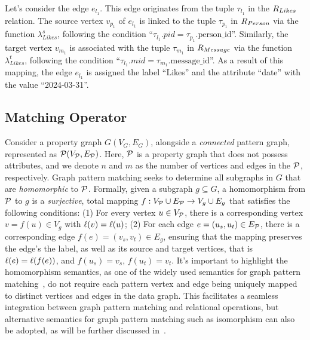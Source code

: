 \begin{example}
    Let's consider the edge $e_{l_1}$. This edge originates from the tuple $\tau_{l_1}$ in the ${R_{Likes}}$ relation. The source vertex $v_{p_1}$ of $e_{l_1}$ is linked to the tuple $\tau_{p_1}$ in ${R_{Person}}$ via the function $\lambda_{Likes}^s$, following the condition ``$\tau_{l_1}.pid = \tau_{p_1}.\text{person\_id}$''. Similarly, the target vertex $v_{m_1}$ is associated with the tuple $\tau_{m_1}$ in ${R_{Message}}$ via the function $\lambda_{Likes}^t$, following the condition ``$\tau_{l_1}.mid = \tau_{m_1}.\text{message\_id}$''. As a result of this mapping, the edge $e_{l_1}$ is assigned the label ``Likes'' and the attribute ``date'' with the value ``2024-03-31''.
\end{example}



\subsection{Matching Operator}
\label{sec:matching-operator}
Consider a property graph \(G(V_G, E_G)\), alongside a \emph{connected} pattern graph, represented as \(\mathcal{P}(V_{\mathcal{P}}, E_{\mathcal{P}})\). Here, \(\mathcal{P}\) is a property graph that does not possess attributes, and
we denote $n$ and $m$ as the number of vertices and edges in the $\mathcal{P}$, respectively.
Graph pattern matching seeks to determine all subgraphs in \(G\) that are \emph{homomorphic} to \(\mathcal{P}\).
Formally, given a subgraph $g \subseteq G$, a homomorphism from \(\mathcal{P}\) to \(g\) is a \emph{surjective}, total mapping \(f: V_{\mathcal{P}} \cup E_{\mathcal{P}} \to V_{g} \cup E_{g}\) that satisfies the following conditions: (1) For every vertex \(u \in V_{\mathcal{P}}\), there is a corresponding vertex \(v = f(u) \in V_{g}\) with \(\mathcal{\ell}(v) = \mathcal{\ell}(u)\); (2) For each edge \(e = (u_s, u_t) \in E_{\mathcal{P}}\), there is a corresponding edge \(f(e) = (v_s, v_t) \in E_{g}\), ensuring that the mapping preserves the edge's the label, as well as its source and target vertices, that is \(\mathcal{\ell}(e) = \mathcal{\ell}(f(e))\), and \(f(u_s) = v_s\), \(f(u_t) = v_t\). It's important to highlight the homomorphism semantics, as one of the widely used semantics for graph pattern matching~\cite{angles2017foundations}, do not require each pattern vertex and edge being uniquely mapped to distinct vertices and edges in the data graph. This facilitates a seamless integration between graph pattern matching and relational operations, but alternative semantics for graph pattern matching such as isomorphism can also be adopted, as will be further discussed in~.

